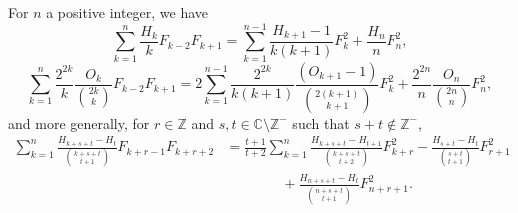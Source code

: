 \documentclass[12pt,reqno]{article}
\begin{document}
	
	\begin{theorem}
		For $n$ a positive integer, we have
		\begin{equation}\label{eq.xslb526}
			\sum_{k = 1}^n \frac{{H_k}}{k} F_{k - 2} F_{k + 1} = \sum_{k = 1}^{n - 1} \frac{{H_{k + 1} - 1}}{k(k + 1)} F_k^2 + \frac{{H_n}}{n} F_n^2,
		\end{equation}
		\begin{equation}\label{eq.qsl14h7}
			\sum_{k = 1}^n \frac{2^{2k}}{k}\frac{O_k}{\binom{{2k}}{k}} F_{k - 2} F_{k + 1} = 2\sum_{k = 1}^{n - 1} \frac{2^{2k}}{k(k + 1)}\frac{{\left( {O_{k + 1}  - 1} \right)}}{{\binom{{2\left( {k + 1} \right)}}{{k + 1}}}}F_k^2 + \frac{{2^{2n} }}{n}\frac{{O_n }}{{\binom{{2n}}{n}}}F_n^2 ,
		\end{equation}
		and more generally, for $r\in\mathbb Z$ and $s,t\in\mathbb C\setminus\mathbb Z^{-}$ such that $s+t\not\in\mathbb Z^{-}$,
		\begin{equation}\label{eq.c6bw3gq}
			\begin{split}
				\sum_{k = 1}^n {\frac{{H_{k + s + t}  - H_t }}{{\binom{{k + s + t}}{{t + 1}}}}F_{k + r - 1} F_{k + r + 2} }  &= \frac{{t + 1}}{{t + 2}}\sum_{k = 1}^n {\frac{{H_{k + s + t}  - H_{t + 1} }}{{\binom{{k + s + t}}{{t + 2}}}}F_{k + r}^2 }  - \frac{{H_{s + t}  - H_t }}{{\binom{{s + t}}{{t + 1}}}}F_{r + 1}^2\\
				&\qquad\qquad + \frac{{H_{n + s + t}  - H_t }}{{\binom{{n + s + t}}{{t + 1}}}}F_{n + r + 1}^2 .
			\end{split}
		\end{equation}
	\end{theorem}
\end{document}
